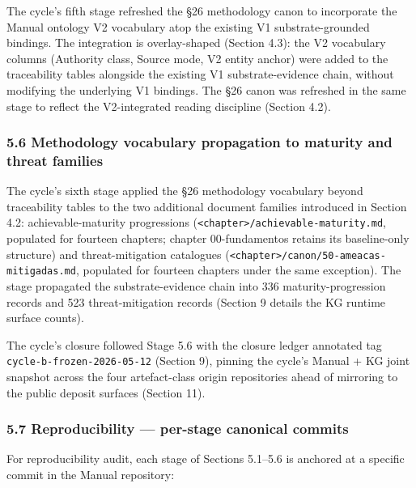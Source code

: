 \documentclass[
]{article}
\begin{document}
The cycle's fifth stage refreshed the §26 methodology canon to
incorporate the Manual ontology V2 vocabulary atop the existing V1
substrate-grounded bindings. The integration is overlay-shaped (Section
4.3): the V2 vocabulary columns (Authority class, Source mode, V2 entity
anchor) were added to the traceability tables alongside the existing V1
substrate-evidence chain, without modifying the underlying V1 bindings.
The §26 canon was refreshed in the same stage to reflect the
V2-integrated reading discipline (Section 4.2).

\subsubsection{5.6 Methodology vocabulary propagation to maturity and
threat
families}\label{methodology-vocabulary-propagation-to-maturity-and-threat-families}

The cycle's sixth stage applied the §26 methodology vocabulary beyond
traceability tables to the two additional document families introduced
in Section 4.2: achievable-maturity progressions
(\texttt{\textless{}chapter\textgreater{}/achievable-maturity.md},
populated for fourteen chapters; chapter 00-fundamentos retains its
baseline-only structure) and threat-mitigation catalogues
(\texttt{\textless{}chapter\textgreater{}/canon/50-ameacas-mitigadas.md},
populated for fourteen chapters under the same exception). The stage
propagated the substrate-evidence chain into 336 maturity-progression
records and 523 threat-mitigation records (Section 9 details the KG
runtime surface counts).

The cycle's closure followed Stage 5.6 with the closure ledger annotated
tag \texttt{cycle-b-frozen-2026-05-12} (Section 9), pinning the cycle's
Manual + KG joint snapshot across the four artefact-class origin
repositories ahead of mirroring to the public deposit surfaces (Section
11).

\subsubsection{5.7 Reproducibility --- per-stage canonical
commits}\label{reproducibility-per-stage-canonical-commits}

For reproducibility audit, each stage of Sections 5.1--5.6 is anchored
at a specific commit in the Manual repository:
\end{document}
